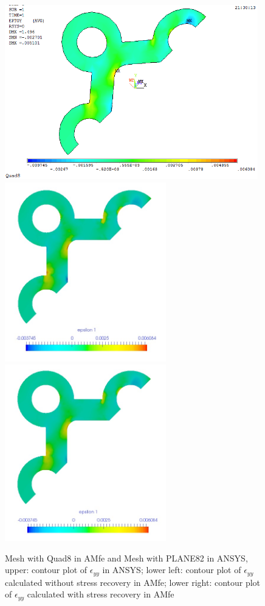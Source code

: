 \begin{figure}[htbp]
	\begin{center}
		\includegraphics[width=11cm,clip]{Quad8_Eyy.png} 	
		\includegraphics[width=7cm,clip]{Quad8_Eyy_PD.png} 			
		\includegraphics[width=7cm,clip]{Quad8_Eyy_P.png} 		
		\caption{Mesh with Quad8 in AMfe and Mesh with PLANE82 in ANSYS, upper: contour plot of $\epsilon_{yy}$ in ANSYS; lower left: contour plot of $\epsilon_{yy}$ calculated without stress recovery in AMfe; lower right: contour plot of $\epsilon_{yy}$ calculated with stress recovery in AMfe} \label{fig: Quad8_Eyy}
	\end{center}
\end{figure}
\clearpage 

